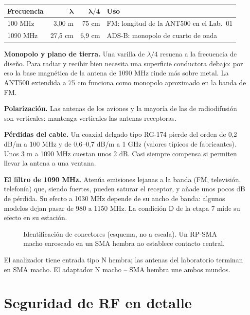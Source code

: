 \begin{longtable}{@{}lrrl@{}}
\toprule
\textbf{Frecuencia} & $\boldsymbol{\lambda}$ & $\boldsymbol{\lambda/4}$ & \textbf{Uso} \\
\midrule
\endhead
100 MHz & 3,00 m & 75 cm & FM: longitud de la ANT500 en el Lab.\ 01 \\
1090 MHz & 27,5 cm & 6,9 cm & ADS-B: monopolo de cuarto de onda \\
\bottomrule
\end{longtable}

\textbf{Monopolo y plano de tierra.} Una varilla de $\lambda/4$ resuena a la frecuencia de diseño. Para radiar y recibir bien necesita una superficie conductora debajo: por eso la base magnética de la antena de 1090 MHz rinde más sobre metal. La ANT500 extendida a 75 cm funciona como monopolo aproximado en la banda de FM.

\textbf{Polarización.} Las antenas de los aviones y la mayoría de las de radiodifusión son verticales: mantenga verticales las antenas receptoras.

\textbf{Pérdidas del cable.} Un coaxial delgado tipo RG-174 pierde del orden de 0,2 dB/m a 100 MHz y de 0,6--0,7 dB/m a 1 GHz (valores típicos de fabricantes). Unos 3 m a 1090 MHz cuestan unos 2 dB. Casi siempre compensa si permiten llevar la antena a una ventana.

\textbf{El filtro de 1090 MHz.} Atenúa emisiones lejanas a la banda (FM, televisión, telefonía) que, siendo fuertes, pueden saturar el receptor, y añade unos pocos dB de pérdida. Su efecto a 1030 MHz depende de su ancho de banda: algunos modelos dejan pasar de 980 a 1150 MHz. La condición D de la etapa 7 mide su efecto en su estación.

\begin{figure}[H]
\centering
\resizebox{\linewidth}{!}{}
\caption{Identificación de conectores (esquema, no a escala). Un RP-SMA macho enroscado en un SMA hembra no establece contacto central.}
\label{fig:a-conectores}
\end{figure}

El analizador tiene entrada tipo N hembra; las antenas del laboratorio terminan en SMA macho. El adaptador N macho -- SMA hembra une ambos mundos.

\section{Seguridad de RF en detalle}
\label{sec:a-seguridad}

